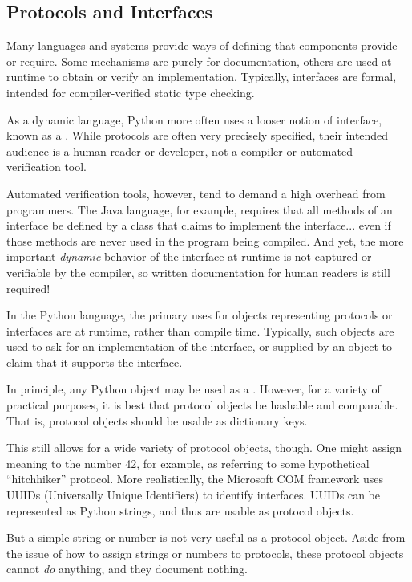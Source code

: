 \subsection{Protocols and Interfaces}

Many languages and systems provide ways of defining  that
components provide or require.  Some mechanisms are purely for documentation,
others are used at runtime to obtain or verify an implementation.  Typically,
interfaces are formal, intended for compiler-verified static type checking.

As a dynamic language, Python more often uses a looser notion of interface,
known as a .  While protocols are often very precisely
specified, their intended audience is a human reader or developer, not a
compiler or automated verification tool.

Automated verification tools, however, tend to demand a high overhead from
programmers.  The Java language, for example, requires that all methods of an
interface be defined by a class that claims to implement the interface...
even if those methods are never used in the program being compiled.  And yet,
the more important \emph{dynamic} behavior of the interface at runtime is not
captured or verifiable by the compiler, so written documentation for human
readers is still required!

In the Python language, the primary uses for objects representing protocols
or interfaces are at runtime, rather than compile time.  Typically, such
objects are used to ask for an implementation of the interface, or supplied
by an object to claim that it supports the interface.

In principle, any Python object may be used as a .
However, for a variety of practical purposes, it is best that protocol objects
be hashable and comparable.  That is, protocol objects should be usable as
dictionary keys.

This still allows for a wide variety of protocol objects, though.  One might
assign meaning to the number 42, for example, as referring to some
hypothetical ``hitchhiker'' protocol.  More realistically, the Microsoft COM
framework uses UUIDs (Universally Unique Identifiers) to identify interfaces.
UUIDs can be represented as Python strings, and thus are usable as protocol
objects.

But a simple string or number is not very useful as a protocol object.  Aside
from the issue of how to assign strings or numbers to protocols, these
protocol objects cannot \emph{do} anything, and they document nothing.

